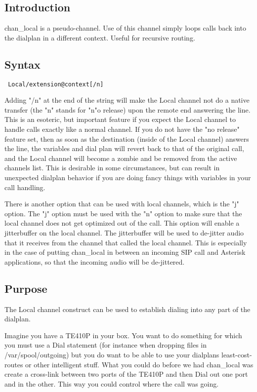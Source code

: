 \subsection{Introduction}

chan\_local is a pseudo-channel. Use of this channel simply loops calls back into the dialplan in a different context. Useful for recursive routing.

\subsection{Syntax}
\begin{verbatim}
 Local/extension@context[/n]
\end{verbatim}

Adding "/n" at the end of the string will make the Local channel not do a native transfer (the "n" stands for "n"o release) upon the remote end answering the line. This is an esoteric, but important feature if you expect the Local channel to handle calls exactly like a normal channel. If you do not have the "no release" feature set, then as soon as the destination (inside of the Local channel) answers the line, the variables and dial plan will revert back to that of the original call, and the Local channel will become a zombie and be removed from the active channels list. This is desirable in some circumstances, but can result in unexpected dialplan behavior if you are doing fancy things with variables in your call handling.

There is another option that can be used with local channels, which is the "j" option.  The "j" option must be used with the "n" option to make sure that the local channel does not get optimized out of the call.  This option will enable a jitterbuffer on the local channel.  The jitterbuffer will be used to de-jitter audio that it receives from the channel that called the local channel.  This is especially in the case of putting chan\_local in between an incoming SIP call and Asterisk applications, so that the incoming audio will be de-jittered.

\subsection{Purpose}

The Local channel construct can be used to establish dialing into any part of the dialplan.

Imagine you have a TE410P in your box. You want to do something for which you must use a Dial statement (for instance when dropping files in /var/spool/outgoing) but you do want to be able to use your dialplans least-cost-routes or other intelligent stuff. What you could do before we had chan\_local was create a cross-link between two ports of the TE410P and then Dial out one port and in the other. This way you could control where the call was going.

